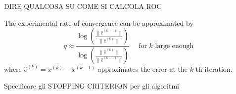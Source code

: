 {\large DIRE QUALCOSA SU COME SI CALCOLA ROC}

The experimental rate of convergence can be approximated by
\begin{equation}
    q \approx \frac{ \log \left(\frac{\| \hat{e}^{(k+1)} \|}{\| \hat{e}^{(k)} \|} \right)}{ \log \left(\frac{\| \hat{e}^{(k)} \|}{\| \hat{e}^{(k-1)} \|} \right)}
    \quad \text{ for $k$ large enough}
    \label{definizione_roc}
\end{equation}
where $\hat{e}^{(k)} = x^{(k)} - x^{(k-1)}$ approximates the error at the $k$-th iteration.


\bigskip
{\large Specificare gli STOPPING CRITERION per gli algoritmi}